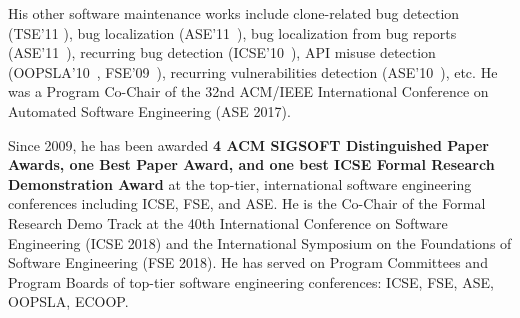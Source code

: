 


His other software maintenance works include clone-related bug
detection (TSE'11 \cite{tse11}), bug localization
(ASE'11~\cite{ase11-phpsync}), bug localization from bug reports
(ASE'11~\cite{ase11-bugscout}), recurring bug detection
(ICSE'10~\cite{icse10}), API misuse detection
(OOPSLA'10~\cite{oopsla10}, FSE'09~\cite{fse09}), recurring
vulnerabilities detection (ASE'10~\cite{ase10}), etc.  He was a
Program Co-Chair of the 32nd ACM/IEEE International Conference on
Automated Software Engineering (ASE 2017).

Since 2009, he has been awarded {\bf 4 ACM SIGSOFT Distinguished Paper
Awards, one Best Paper Award, and one best ICSE Formal Research
Demonstration Award} at the top-tier, international software
engineering conferences including ICSE, FSE, and ASE. He is the
Co-Chair of the Formal Research Demo Track at the 40th International
Conference on Software Engineering (ICSE 2018) and the International
Symposium on the Foundations of Software Engineering (FSE 2018). He
has served on Program Committees and Program Boards of top-tier
software engineering conferences: ICSE, FSE, ASE, OOPSLA,
ECOOP.


